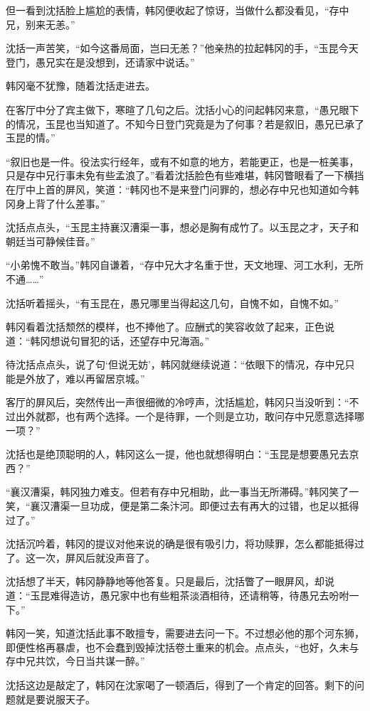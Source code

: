 但一看到沈括脸上尴尬的表情，韩冈便收起了惊讶，当做什么都没看见，“存中兄，别来无恙。”

沈括一声苦笑，“如今这番局面，岂曰无恙？”他亲热的拉起韩冈的手，“玉昆今天登门，愚兄实在是没想到，还请家中说话。”

韩冈毫不犹豫，随着沈括走进去。

在客厅中分了宾主做下，寒暄了几句之后。沈括小心的问起韩冈来意，“愚兄眼下的情况，玉昆也当知道了。不知今日登门究竟是为了何事？若是叙旧，愚兄已承了玉昆的情。”

“叙旧也是一件。役法实行经年，或有不如意的地方，若能更正，也是一桩美事，只是存中兄行事未免有些孟浪了。”看着沈括脸色有些难堪，韩冈瞥眼看了一下横挡在厅中上首的屏风，笑道：“韩冈也不是来登门问罪的，想必存中兄也知道如今韩冈身上背了什么差事。”

沈括点点头，“玉昆主持襄汉漕渠一事，想必是胸有成竹了。以玉昆之才，天子和朝廷当可静候佳音。”

“小弟愧不敢当。”韩冈自谦着，“存中兄大才名重于世，天文地理、河工水利，无所不通……”

沈括听着摇头，“有玉昆在，愚兄哪里当得起这几句，自愧不如，自愧不如。”

韩冈看着沈括颓然的模样，也不捧他了。应酬式的笑容收敛了起来，正色说道：“韩冈想说句冒犯的话，还望存中兄海涵。”

待沈括点点头，说了句‘但说无妨’，韩冈就继续说道：“依眼下的情况，存中兄只能是外放了，难以再留居京城。”

客厅的屏风后，突然传出一声很细微的冷哼声，沈括尴尬，韩冈只当没听到：“不过出外就郡，也有两个选择。一个是待罪，一个则是立功，敢问存中兄愿意选择哪一项？”

沈括也是绝顶聪明的人，韩冈这么一提，他也就想得明白：“玉昆是想要愚兄去京西？”

“襄汉漕渠，韩冈独力难支。但若有存中兄相助，此一事当无所滞碍。”韩冈笑了一笑，“襄汉漕渠一旦功成，便是第二条汴河。即便过去有再大的过错，也足以抵得过了。”

沈括沉吟着，韩冈的提议对他来说的确是很有吸引力，将功赎罪，怎么都能抵得过了。这一次，屏风后就没声音了。

沈括想了半天，韩冈静静地等他答复。只是最后，沈括瞥了一眼屏风，却说道：“玉昆难得造访，愚兄家中也有些粗茶淡酒相待，还请稍等，待愚兄去吩咐一下。”

韩冈一笑，知道沈括此事不敢擅专，需要进去问一下。不过想必他的那个河东狮，即便性格再暴虐，也不会蠢到毁掉沈括卷土重来的机会。点点头，“也好，久未与存中兄共饮，今日当共谋一醉。”

沈括这边是敲定了，韩冈在沈家喝了一顿酒后，得到了一个肯定的回答。剩下的问题就是要说服天子。

